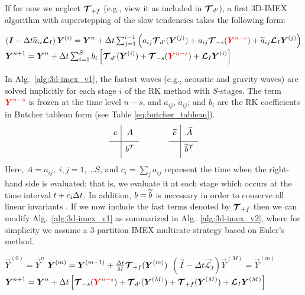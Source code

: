 \documentclass{report}
\begin{document}
If for now we neglect $\boldsymbol{{\mathcal{T}}}_{+f}$ (e.g., view it as included in  $\boldsymbol{{\mathcal{T}}}_{d'}$), a first 3D-IMEX algorithm with superstepping of the slow tendencies takes the following form:
\begin{algorithm}
\label{alg:3d-imex_v1}
\begin{algorithmic}
\State
{}
\State $\left( \boldsymbol{{I}} - \Delta t \widetilde{a}_{ii} \boldsymbol{{\mathcal{L}}}_I \right) \boldsymbol{{Y}}^{(i)}=\boldsymbol{{Y}}^{n} + \Delta t \sum_{j=1}^{i-1} \left( a_{ij} \boldsymbol{{\mathcal{T}}}_{d'}(\boldsymbol{{Y}}^{(j)}) + a_{ij} \boldsymbol{{\mathcal{T}}}_{-s}(\textcolor{red}{\boldsymbol{{Y}}^{n-s}})
+ \widetilde{a}_{ij} \boldsymbol{{\mathcal{L}}}_I \boldsymbol{{Y}}^{(j)} \right)$ 
\EndFor %
\State $\boldsymbol{{Y}}^{n+1}=\boldsymbol{{Y}}^{n} + \Delta t \sum_{i=1}^{S} b_{i} \left[ \boldsymbol{{\mathcal{T}}}_{d'}(\boldsymbol{{Y}}^{(i)}) + \boldsymbol{{\mathcal{T}}}_{-s}(\textcolor{red}{\boldsymbol{{Y}}^{n-s}})
+ \boldsymbol{{\mathcal{L}}}_I \boldsymbol{{Y}}^{(i)} \right]$
\EndFunction
\end{algorithmic}
\end{algorithm}
In Alg.\ \ref{alg:3d-imex_v1}, the fastest waves (e.g., acoustic and gravity waves) are solved implicitly for each stage $i$ of the RK method with $S$-stages. The term $\textcolor{red}{\boldsymbol{{Y}}^{n-s}}$ is frozen at the time level $n-s$, and $a_{ij}$, $\widetilde{a}_{ij}$; and $b_i$ are the RK coefficients in Butcher tableau form (see Table \ref{eq:butcher_tableau}).
\begin{equation}
\begin{array}{c|c}
\ST c&A\\
\hline
\ST  & b\transpose
\end{array}
\hspace{0.5in}
\begin{array}{c|c}
\ST \wt{c} & \wt{A} \\
\hline
\ST  & \wt{b} \transpose
\end{array}
\label{eq:butcher_tableau}
\end{equation}
Here, $A=a_{ij}, \; i,j=1,\ldots S$, and $c_i=\sum_{j} a_{ij}$ represent the time when the right-hand side is evaluated; that is, we evaluate it at each stage which occurs at the time interval $t+c_i {\Delta t}$.
In addition, $b=\widetilde{b}$ is necessary in order to conserve all linear invariants \citep{giraldo:2013}. If we now include the fast terms denoted by $\boldsymbol{{\mathcal{T}}}_{+f}$ then we can modify Alg.\ \ref{alg:3d-imex_v1} as summarized in Alg.\ \ref{alg:3d-imex_v2}, where for simplicity we assume a 3-partition IMEX multirate strategy based on Euler's method.
\begin{algorithm}
\label{alg:3d-imex_v2}
\begin{algorithmic}
\State
{}
\State $\vec{Y}^{(0)}=\vec{Y}^{n}$
\State $\boldsymbol{{Y}}^{(m)}=\boldsymbol{{Y}}^{(m-1)} + \frac{\Delta t}{M} \boldsymbol{{\mathcal{T}}}_{+f}(\boldsymbol{{Y}}^{(m)})$
\EndFor %
\State $\left( \vec{I} - \Delta t \vec{\mathcal{L}}_I \right) \vec{Y}^{(M)}=\vec{Y}^{(m)}$
\State $\boldsymbol{{Y}}^{n+1}=\boldsymbol{{Y}}^{n} + \Delta t \left[ \boldsymbol{{\mathcal{T}}}_{-s}(\textcolor{red}{\boldsymbol{{Y}}^{n-s}}) + \boldsymbol{{\mathcal{T}}}_{d'}(\boldsymbol{{Y}}^{(M)}) + 
\boldsymbol{{\mathcal{T}}}_{+f}(\boldsymbol{{Y}}^{(M)}) + 
\boldsymbol{{\mathcal{L}}}_I \boldsymbol{{Y}}^{(M)} \right]$
\EndFunction
\end{algorithmic}
\end{algorithm}
\end{document}
